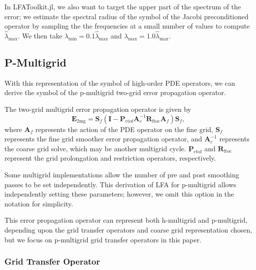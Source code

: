 \documentclass[review]{siamart190516}
\begin{document}
In LFAToolkit.jl, we also want to target the upper part of the spectrum of the error; we estimate the spectral radius of the symbol of the Jacobi preconditioned operator by sampling the the frequencies at a small number of values to compute $\hat{\lambda}_{\text{max}}$.
We then take $\lambda_{\text{min}} = 0.1 \hat{\lambda}_{\text{max}}$ and $\lambda_{\text{max}} = 1.0 \hat{\lambda}_{\text{max}}$.

\subsection{P-Multigrid}\label{sec:multigrid}

With this representation of the symbol of high-order PDE operators, we can derive the symbol of the p-multigrid two-grid error propagation operator.

The two-grid multigrid error propagation operator is given by
\begin{equation}
\mathbf{E}_{\text{2mg}} = \mathbf{S}_f \left( \mathbf{I} - \mathbf{P}_{\text{ctof}} \mathbf{A}_c^{-1} \mathbf{R}_{\text{ftoc}} \mathbf{A}_f \right) \mathbf{S}_f,
\end{equation}
where $\mathbf{A}_f$ represents the action of the PDE operator on the fine grid, $\mathbf{S}_f$ represents the fine grid smoother error propagation operator, and $\mathbf{A}_c^{-1}$ represents the coarse grid solve, which may be another multigrid cycle.
$\mathbf{P}_{\text{ctof}}$ and $\mathbf{R}_{\text{ftoc}}$ represent the grid prolongation and restriction operators, respectively.

Some multigrid implementations allow the number of pre and post smoothing passes to be set independently.
This derivation of LFA for p-multigrid allows independently setting these parameters; however, we omit this option in the notation for simplicity.

This error propagation operator can represent both h-multigrid and p-multigrid, depending upon the grid transfer operators and coarse grid representation chosen, but we focus on p-multigrid grid transfer operators in this paper.

\subsubsection{Grid Transfer Operator}\label{sec:grids}
\end{document}
